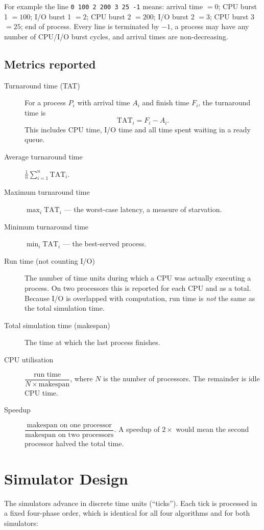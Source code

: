 \documentclass[11pt,a4paper]{article}
\begin{document}
For example the line \texttt{0 100 2 200 3 25 -1} means: arrival time $=0$;
CPU burst 1 $=100$; I/O burst 1 $=2$; CPU burst 2 $=200$; I/O burst 2 $=3$;
CPU burst 3 $=25$; end of process. Every line is terminated by $-1$, a process may
have any number of CPU/I/O burst cycles, and arrival times are non-decreasing.

\subsection{Metrics reported}

\begin{description}
  \item[Turnaround time (TAT)] For a process $P_i$ with arrival time $A_i$ and
        finish time $F_i$, the turnaround time is
        \[ \mathrm{TAT}_i = F_i - A_i. \]
        This includes CPU time, I/O time and all time spent waiting in a ready queue.
  \item[Average turnaround time] $\frac{1}{n}\sum_{i=1}^{n}\mathrm{TAT}_i$.
  \item[Maximum turnaround time] $\max_i \mathrm{TAT}_i$ --- the worst-case latency,
        a measure of starvation.
  \item[Minimum turnaround time] $\min_i \mathrm{TAT}_i$ --- the best-served process.
  \item[Run time (not counting I/O)] The number of time units during which a CPU was
        actually executing a process. On two processors this is reported for each CPU
        and as a total. Because I/O is overlapped with computation, run time is
        \emph{not} the same as the total simulation time.
  \item[Total simulation time (makespan)] The time at which the last process finishes.
  \item[CPU utilisation] $\dfrac{\text{run time}}{N \times \text{makespan}}$, where $N$ is
        the number of processors. The remainder is idle CPU time.
  \item[Speedup] $\dfrac{\text{makespan on one processor}}{\text{makespan on two processors}}$.
        A speedup of $2\times$ would mean the second processor halved the total time.
\end{description}

\section{Simulator Design}

The simulators advance in discrete time units (``ticks''). Each tick is processed in a
fixed four-phase order, which is identical for all four algorithms and for both
simulators:
\end{document}
